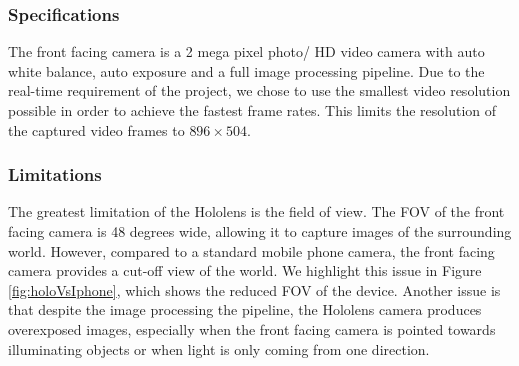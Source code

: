 \subsubsection{Specifications}
The front facing camera is a 2 mega pixel photo/ HD video camera with auto white balance, auto exposure and a full image processing pipeline. Due to the real-time requirement of the project, we chose to use the smallest video resolution possible in order to achieve the fastest frame rates. This limits the resolution of the captured video frames to $896\times 504$.

\subsubsection{Limitations}
The greatest limitation of the Hololens is the field of view. The FOV of the front facing camera is 48 degrees wide, allowing it to capture images of the surrounding world. However, compared to a standard mobile phone camera, the front facing camera provides a cut-off view of the world. We highlight this issue in Figure \ref{fig:holoVsIphone}, which shows the reduced FOV of the device. Another issue is that despite the image processing the pipeline, the Hololens camera produces overexposed images, especially when the front facing camera is pointed towards illuminating objects or when light is only coming from one direction. 

